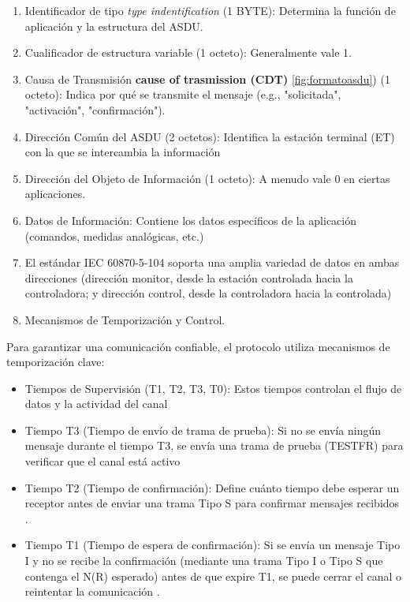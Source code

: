 \documentclass[a5paper]{book}%
\begin{document}
\begin{enumerate}
\item Identificador de tipo \textit{type indentification} (1 BYTE): Determina la función de aplicación y la estructura del ASDU.
\item Cualificador de estructura variable (1 octeto): Generalmente vale 1.
\item Causa de Transmisión \textbf{cause of trasmission (CDT)} \ref{fig:formatoasdu}) (1 octeto): Indica por qué se transmite el mensaje (e.g., "solicitada", "activación", "confirmación").
\item Dirección Común del ASDU (2 octetos): Identifica la estación terminal (ET) con la que se intercambia la información
\item Dirección del Objeto de Información (1 octeto): A menudo vale 0 en ciertas aplicaciones.
\item Datos de Información: Contiene los datos específicos de la aplicación (comandos, medidas analógicas, etc.)
\item El estándar IEC 60870-5-104 soporta una amplia variedad de datos en ambas direcciones (dirección monitor, desde la estación controlada hacia la controladora; y dirección control, desde la controladora hacia la controlada)
\item Mecanismos de Temporización y Control.

\end{enumerate}

Para garantizar una comunicación confiable, el protocolo utiliza mecanismos de temporización clave:

\begin{itemize}
\item Tiempos de Supervisión (T1, T2, T3, T0): Estos tiempos controlan el flujo de datos y la actividad del canal
\item Tiempo T3 (Tiempo de envío de trama de prueba): Si no se envía ningún mensaje durante el tiempo T3, se envía una trama de prueba (TESTFR) para verificar que el canal está activo
\item Tiempo T2 (Tiempo de confirmación): Define cuánto tiempo debe esperar un receptor antes de enviar una trama Tipo S para confirmar mensajes recibidos
.
\item Tiempo T1 (Tiempo de espera de confirmación): Si se envía un mensaje Tipo I y no se recibe la confirmación (mediante una trama Tipo I o Tipo S que contenga el N(R) esperado) antes de que expire T1, se puede cerrar el canal o reintentar la comunicación
.
\end{itemize}
\end{document}
